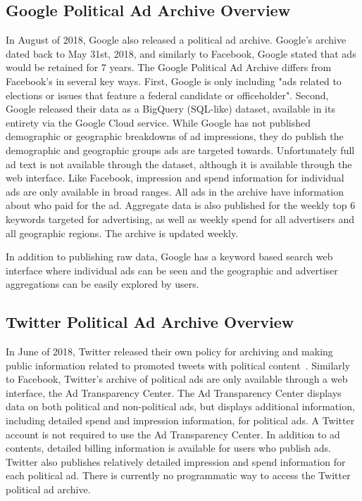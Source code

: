\documentclass[fleqn,10pt]{wlscirep}
\begin{document}
\subsection*{Google Political Ad Archive Overview}
In August of 2018, Google also released a political ad archive\cite{Google_Political}. Google's archive dated back to May 31st, 2018, and similarly to Facebook, Google stated that ads would be retained for 7 years. The Google Political Ad Archive differs from Facebook's in several key ways. First, Google is only including "ads related to elections or issues that feature a federal candidate or officeholder"\cite{Google_Political}. Second, Google released their data as a BigQuery (SQL-like) dataset, available in its entirety via the Google Cloud service\cite{Google_Data}. While Google has not published demographic or geographic breakdowns of ad impressions, they do publish the demographic and geographic groups ads are targeted towards. Unfortunately full ad text is not available through the dataset, although it is available through the web interface. Like Facebook, impression and spend information for individual ads are only available in broad ranges. All ads in the archive have information about who paid for the ad. Aggregate data is also published for the weekly top 6 keywords targeted for advertising, as well as weekly spend for all advertisers and all geographic regions. The archive is updated weekly.

In addition to publishing raw data, Google has a keyword based search web interface where individual ads can be seen and the geographic and advertiser aggregations can be easily explored by users.

\subsection*{Twitter Political Ad Archive Overview}
In June of 2018, Twitter released their own policy for archiving and making public information related to promoted tweets with political content~\cite{Twitter_Political}. Similarly to Facebook, Twitter's archive of political ads are only available through a web interface, the Ad Transparency Center\cite{Twitter_Data}. The Ad Transparency Center displays data on both political and non-political ads, but displays additional information, including detailed spend and impression information, for political ads. A Twitter account is not required to use the Ad Transparency Center. In addition to ad contents, detailed billing information is available for users who publish ads. Twitter also publishes relatively detailed impression and spend information for each political ad. There is currently no programmatic way to access the Twitter political ad archive.
\end{document}
